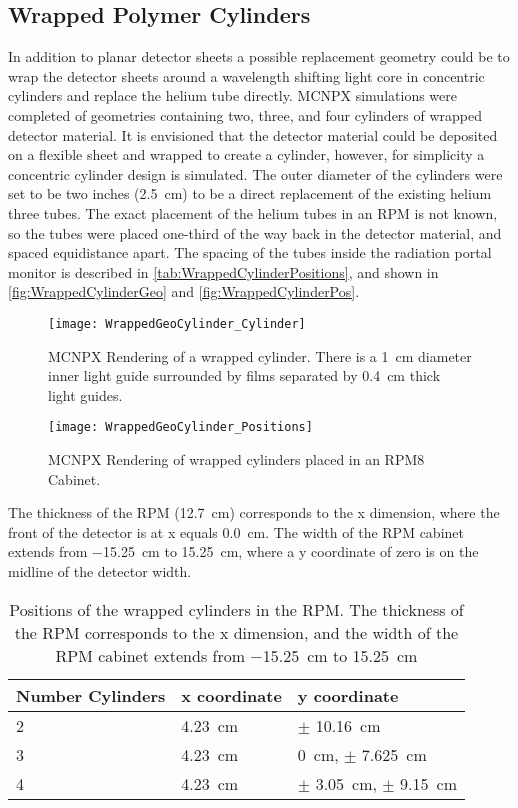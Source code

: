 \subsection{Wrapped Polymer Cylinders}
\label{sec:WrappedCylinders}

In addition to planar detector sheets a possible replacement geometry could be to wrap the detector sheets around a wavelength shifting light core in concentric cylinders and replace the helium tube directly.
MCNPX simulations were completed of geometries containing two, three, and four cylinders of wrapped detector material.
It is envisioned that the detector material could be deposited on a flexible sheet and wrapped to create a cylinder, however, for simplicity a concentric cylinder design is simulated.
The outer diameter of the cylinders were set to be two inches (\SI{2.5}{\cm}) to be a direct replacement of the existing helium three tubes.
The exact placement of the helium tubes in an RPM is not known, so the tubes were placed one-third of the way back in the detector material, and spaced equidistance apart.
The spacing of the tubes inside the radiation portal monitor is described in \autoref{tab:WrappedCylinderPositions}, and shown in \autoref{fig:WrappedCylinderGeo} and \autoref{fig:WrappedCylinderPos}.
\begin{figure}
  \centering
  \texttt{[image: WrappedGeoCylinder\_Cylinder]}
  \caption[Rendering of Wrapped Cylinder Geometry]{MCNPX Rendering of a wrapped cylinder.  There is a \SI{1}{\cm} diameter inner light guide surrounded by films separated by \SI{0.4}{\cm} thick light guides.}
  \label{fig:WrappedCylinderGeo}
\end{figure}
\begin{figure}
  \centering
  \texttt{[image: WrappedGeoCylinder\_Positions]}
  \caption[Positions of Wrapped Cylinders in RPM Cabinet]{MCNPX Rendering of wrapped cylinders placed in an RPM8 Cabinet.}
  \label{fig:WrappedCylinderPos}
\end{figure}
The thickness of the RPM (\SI{12.7}{\cm}) corresponds to the x dimension, where the front of the detector is at x equals \SI{0.0}{\cm}.
The width of the RPM cabinet extends from \SI{-15.25}{\cm} to \SI{15.25}{\cm}, where a y coordinate of zero is on the midline of the detector width.
\begin{table}
  \caption[Wrapped Cylinder Positions]{Positions of the wrapped cylinders in the RPM. The thickness of the RPM corresponds to the x dimension, and the width of the RPM cabinet extends from \SI{-15.25}{\cm} to \SI{15.25}{\cm}}
  \label{tab:WrappedCylinderPositions}
  \begin{tabular}{m{2cm} | m{3cm} m{4cm} }
    \toprule
    Number Cylinders & x coordinate & y coordinate \\
    \midrule
    2 & \SI{4.23}{\cm} & $\pm$ \SI{10.16}{\cm} \\
    3 & \SI{4.23}{\cm} & \SI{0}{\cm}, $\pm$ \SI{7.625}{\cm} \\
    4 & \SI{4.23}{\cm} & $\pm$ \SI{3.05}{\cm}, $\pm$ \SI{9.15}{\cm} \\
    \bottomrule
  \end{tabular}
\end{table}
